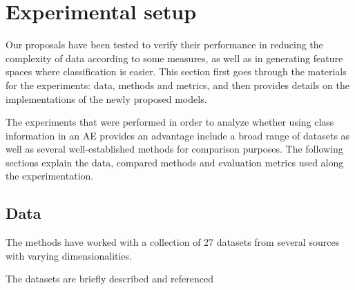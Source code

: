 \section{Experimental setup}\label{p6sec.setup}

Our proposals have been tested to verify their performance in reducing the complexity of data according to some measures, as well as in generating feature spaces where  classification is easier. This section first goes through the materials for the experiments: data, methods and metrics, and then provides details on the implementations of the newly proposed models.

The experiments that were performed in order to analyze whether using class information in an AE provides an advantage include a broad range of datasets as well as several well-established methods for comparison purposes. The following sections explain the data, compared methods and evaluation metrics used along the experimentation.

\subsection{Data}

The methods have worked with a collection of 27 datasets from several sources with varying dimensionalities.


The datasets are briefly described and referenced 


